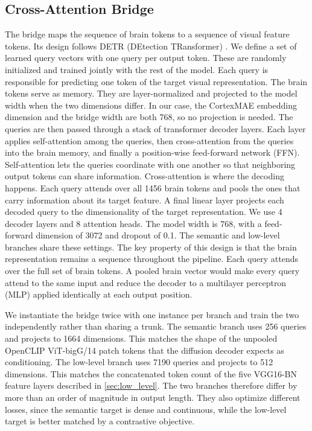 \subsection{Cross-Attention Bridge}
The bridge maps the sequence of brain tokens to a sequence of visual feature tokens. Its design follows DETR (DEtection TRansformer) \cite{DBLP:journals/corr/abs-2005-12872}. We define a set of learned query vectors with one query per output token. These are randomly initialized and trained jointly with the rest of the model. Each query is responsible for predicting one token of the target visual representation.
The brain tokens serve as memory. They are layer-normalized and projected to the model width when the two dimensions differ. In our case, the CortexMAE embedding dimension and the bridge width are both 768, so no projection is needed. The queries are then passed through a stack of transformer decoder layers. Each layer applies self-attention among the queries, then cross-attention from the queries into the brain memory, and finally a position-wise feed-forward network (FFN). Self-attention lets the queries coordinate with one another so that neighboring output tokens can share information. Cross-attention is where the decoding happens. Each query attends over all 1456 brain tokens and pools the ones that carry information about its target feature. A final linear layer projects each decoded query to the dimensionality of the target representation.
We use 4 decoder layers and 8 attention heads. The model width is 768, with a feed-forward dimension of 3072 and dropout of 0.1. The semantic and low-level branches share these settings.
The key property of this design is that the brain representation remains a sequence throughout the pipeline. Each query attends over the full set of brain tokens. A pooled brain vector would make every query attend to the same input and reduce the decoder to a multilayer perceptron (MLP) applied identically at each output position.

We instantiate the bridge twice with one instance per branch and train the two independently rather than sharing a trunk. The semantic branch uses 256 queries and projects to 1664 dimensions. This matches the shape of the unpooled OpenCLIP ViT-bigG/14 \cite{radford2021learningtransferablevisualmodels, ilharco_gabriel_2021_5143773, schuhmann2022laionb} patch tokens that the diffusion decoder expects as conditioning. The low-level branch uses 7190 queries and projects to 512 dimensions. This matches the concatenated token count of the five VGG16-BN feature layers described in \cref{sec:low_level}. The two branches therefore differ by more than an order of magnitude in output length. They also optimize different losses, since the semantic target is dense and continuous, while the low-level target is better matched by a contrastive objective.

